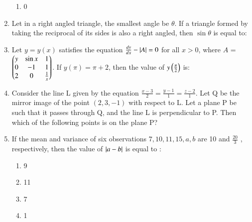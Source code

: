 \documentclass[journal]{IEEEtran}
\begin{document}
\begin{enumerate}
\begin{enumerate}
     \item 0
 \end{enumerate}
  \item Let in a right angled triangle, the smallest angle be $\theta$. If a triangle formed by taking the reciprocal of its sides is also a right angled, then $\sin \theta$ is equal to:
 \begin{enumerate}
 \end{enumerate}
  \item Let $y = y(x)$ satisfies the equation $\frac{dy}{dx} - \left\vert A\right\vert = 0$ for all $x > 0$, where $A$ = $\begin{pmatrix}y & \sin x & 1 \\ 0 & -1 & 1 \\ 2 & 0 & \frac{1}{x}\end{pmatrix}$. If $y(\pi) = \pi + 2$, then the value of $y\left(\frac{\pi}{2}\right)$ is:
 \begin{enumerate}
 \end{enumerate}
  \item Consider the line L given by the equation $\frac{x-3}{2} = \frac{y-1}{1} = \frac{z-2}{1}$. Let Q be the mirror image of the point $(2,3,-1)$ with respect to L. Let a plane P be such that it passes through Q, and the line L is perpendicular to P. Then which of the following points is on the plane P?
 \begin{enumerate}
 \end{enumerate}
 \item If the mean and variance of six observations $7, 10, 11, 15, a, b $ are 10 and $\frac{20}{3}$
 , respectively, then the value of $\left\vert a -
 b\right\vert$ is equal to :
 \begin{enumerate}
     \item 9
     \item 11
     \item 7
     \item 1
 \end{enumerate}
 \end{enumerate}
\end{document}
